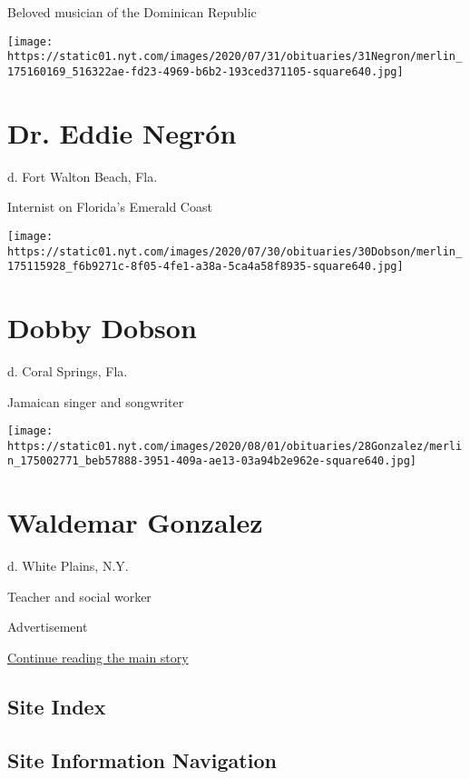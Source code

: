 Beloved musician of the Dominican Republic

\texttt{[image: https://static01.nyt.com/images/2020/07/31/obituaries/31Negron/merlin\_175160169\_516322ae-fd23-4969-b6b2-193ced371105-square640.jpg]}

\hypertarget{dr-eddie-negruxf3n}{%
\section{Dr. Eddie Negrón}\label{dr-eddie-negruxf3n}}

d. Fort Walton Beach, Fla.

Internist on Florida's Emerald Coast

\texttt{[image: https://static01.nyt.com/images/2020/07/30/obituaries/30Dobson/merlin\_175115928\_f6b9271c-8f05-4fe1-a38a-5ca4a58f8935-square640.jpg]}

\hypertarget{dobby-dobson}{%
\section{Dobby Dobson}\label{dobby-dobson}}

d. Coral Springs, Fla.

Jamaican singer and songwriter

\texttt{[image: https://static01.nyt.com/images/2020/08/01/obituaries/28Gonzalez/merlin\_175002771\_beb57888-3951-409a-ae13-03a94b2e962e-square640.jpg]}

\hypertarget{waldemar-gonzalez}{%
\section{Waldemar Gonzalez}\label{waldemar-gonzalez}}

d. White Plains, N.Y.

Teacher and social worker

Advertisement

\protect\hyperlink{after-bottom}{Continue reading the main story}

\hypertarget{site-index}{%
\subsection{Site Index}\label{site-index}}

\hypertarget{site-information-navigation}{%
\subsection{Site Information
Navigation}\label{site-information-navigation}}


